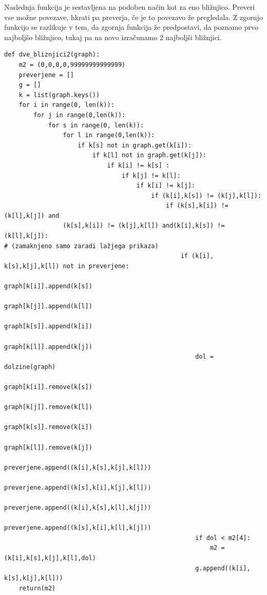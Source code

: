 \documentclass[a4paper,10pt]{article}
\begin{document}
Naslednja funkcija je sestavljena na podoben način kot za eno bližnjico. Preveri vse možne povezave, hkrati pa preverja, če je to povezavo že pregledala. Z zgornjo funkcijo se razlikuje v tem, da zgornja funkcija že predpostavi, da poznamo prvo najboljšo bližnjico, tukaj pa na novo izračunamo 2 najboljši bližnjici.
\small
\begin{verbatim}
def dve_bliznjici2(graph):
    m2 = (0,0,0,0,99999999999999)
    preverjene = []
    g = []
    k = list(graph.keys())
    for i in range(0, len(k)):
        for j in range(0,len(k)):
            for s in range(0, len(k)):
                for l in range(0,len(k)):
                    if k[s] not in graph.get(k[i]):
                        if k[l] not in graph.get(k[j]):
                            if k[i] != k[s] :
                                if k[j] != k[l]:
                                    if k[i] != k[j]:
                                        if (k[i],k[s]) != (k[j],k[l]):
                                            if (k[s],k[i]) != (k[l],k[j]) and 
				(k[s],k[i]) != (k[j],k[l]) and(k[i],k[s]) != (k[l],k[j]):
# (zamaknjeno samo zaradi lažjega prikaza)
                                                if (k[i], k[s],k[j],k[l]) not in preverjene:
                                                    graph[k[i]].append(k[s])
                                                    graph[k[j]].append(k[l])
                                                    graph[k[s]].append(k[i])
                                                    graph[k[l]].append(k[j])
                                                    dol = dolzine(graph)
                                                    graph[k[i]].remove(k[s])
                                                    graph[k[j]].remove(k[l])
                                                    graph[k[s]].remove(k[i])
                                                    graph[k[l]].remove(k[j])
                                                    preverjene.append((k[i],k[s],k[j],k[l]))
                                                    preverjene.append((k[s],k[i],k[j],k[l]))
                                                    preverjene.append((k[i],k[s],k[l],k[j]))
                                                    preverjene.append((k[s],k[i],k[l],k[j]))
                                                    if dol < m2[4]:
                                                        m2 = (k[i],k[s],k[j],k[l],dol)
                                                    g.append((k[i], k[s],k[j],k[l]))
    return(m2)
\end{verbatim}
\normalsize
\end{document}

